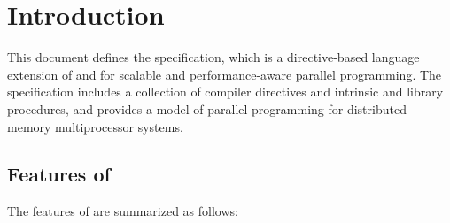 \pagewiselinenumbers

\chapter{Introduction}
\setcounter{page}{1}

This document defines the {\XMP} specification, which is a
directive-based language extension of {\Fort} and {\C} for scalable and
performance-aware parallel programming.
%
The specification includes a collection of compiler directives and
intrinsic and library procedures, and provides a model of parallel
programming for distributed memory multiprocessor systems.


\section{Features of {\XMP}}

The features of {\XMP} are summarized as follows:

